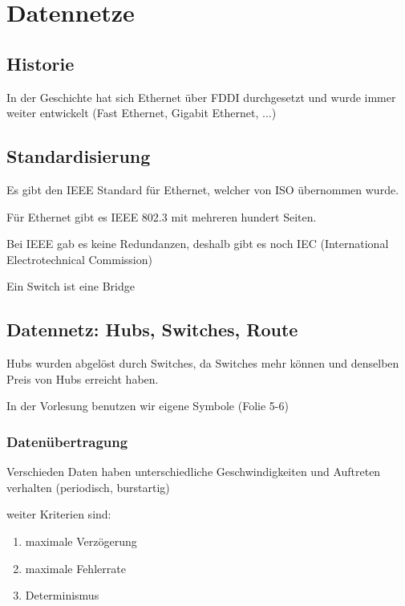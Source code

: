 \documentclass[a4paper]{article}
\title{\docTitle}
\author{Moritz}
\date{\today}
\begin{document}
\maketitle
\tableofcontents


\section{Datennetze}

\subsection{Historie}

In der Geschichte hat sich Ethernet über FDDI durchgesetzt und wurde immer weiter entwickelt (Fast Ethernet, Gigabit Ethernet, ...)

\subsection{Standardisierung}

Es gibt den IEEE Standard für Ethernet, welcher von ISO übernommen wurde.

Für Ethernet gibt es IEEE 802.3 mit mehreren hundert Seiten.

Bei IEEE gab es keine Redundanzen, deshalb gibt es noch IEC (International Electrotechnical Commission)

Ein Switch ist eine Bridge

\subsection{Datennetz: Hubs, Switches, Route}

Hubs wurden abgelöst durch Switches, da Switches mehr können und denselben Preis von Hubs erreicht haben.

In der Vorlesung benutzen wir eigene Symbole (Folie 5-6)

\subsubsection{Datenübertragung}

Verschieden Daten haben unterschiedliche Geschwindigkeiten und Auftreten verhalten (periodisch, burstartig)

weiter Kriterien sind:

\begin{enumerate}
    \item maximale Verzögerung
    \item maximale Fehlerrate
    \item Determinismus
\end{enumerate}
\end{document}
